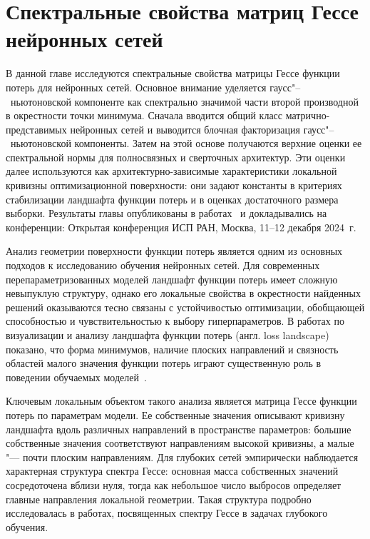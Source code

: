 \chapter{Спектральные свойства матриц Гессе нейронных сетей}\label{ch:hessian}

В данной главе исследуются спектральные свойства матрицы Гессе функции потерь для нейронных сетей. Основное внимание уделяется гаусс"--~ньютоновской компоненте как спектрально значимой части второй производной в окрестности точки минимума. Сначала вводится общий класс матрично-представимых нейронных сетей и выводится блочная факторизация гаусс"--~ньютоновской компоненты. Затем на этой основе получаются верхние оценки ее спектральной нормы для полносвязных и сверточных архитектур. Эти оценки далее используются как архитектурно-зависимые характеристики локальной кривизны оптимизационной поверхности: они задают константы в критериях стабилизации ландшафта функции потерь и в оценках достаточного размера выборки. Результаты главы опубликованы в работах~\cite{kiselev2024unraveling,meshkov2024convnets} и докладывались на конференции: Открытая конференция ИСП РАН, Москва, 11--12 декабря 2024~г.


Анализ геометрии поверхности функции потерь является одним из основных подходов к исследованию обучения нейронных сетей. Для современных перепараметризованных моделей ландшафт функции потерь имеет сложную невыпуклую структуру, однако его локальные свойства в окрестности найденных решений оказываются тесно связаны с устойчивостью оптимизации, обобщающей способностью и чувствительностью к выбору гиперпараметров. В работах по визуализации и анализу ландшафта функции потерь (англ. loss landscape) показано, что форма минимумов, наличие плоских направлений и связность областей малого значения функции потерь играют существенную роль в поведении обучаемых моделей~\cite{li2018visualizing,draxler2018essentially,garipov2018loss}.

Ключевым локальным объектом такого анализа является матрица Гессе функции потерь по параметрам модели. Ее собственные значения описывают кривизну ландшафта вдоль различных направлений в пространстве параметров: большие собственные значения соответствуют направлениям высокой кривизны, а малые "--- почти плоским направлениям. Для глубоких сетей эмпирически наблюдается характерная структура спектра Гессе: основная масса собственных значений сосредоточена вблизи нуля, тогда как небольшое число выбросов определяет главные направления локальной геометрии. Такая структура подробно исследовалась в работах, посвященных спектру Гессе в задачах глубокого обучения. \cite{sagun2017hessian,ghorbani2019investigation,papyan2019,papyan2020traces,singh2021analytic}

